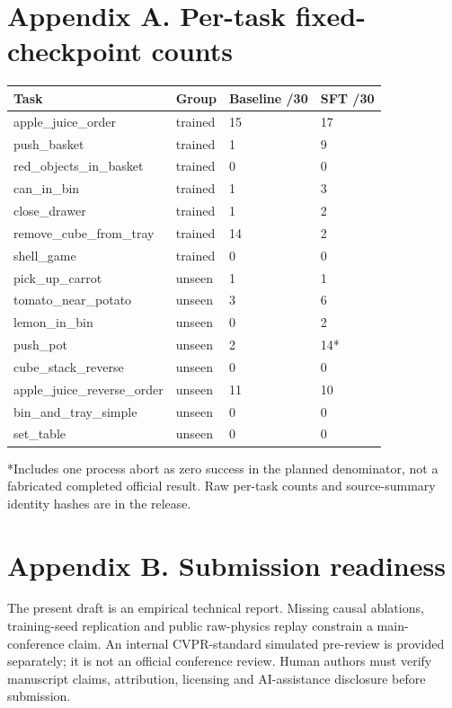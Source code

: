 \documentclass[10pt]{article}
\begin{document}
\section*{Appendix A. Per-task fixed-checkpoint counts}

\par\noindent\begin{minipage}{\linewidth}\centering\small\setlength{\tabcolsep}{4pt}\begin{tabular}{p{}p{}p{}p{}}\hline
Task & Group & Baseline /30 & SFT /30 \\ \hline
apple\_juice\_order & trained & 15 & 17 \\
push\_basket & trained & 1 & 9 \\
red\_objects\_in\_basket & trained & 0 & 0 \\
can\_in\_bin & trained & 1 & 3 \\
close\_drawer & trained & 1 & 2 \\
remove\_cube\_from\_tray & trained & 14 & 2 \\
shell\_game & trained & 0 & 0 \\
pick\_up\_carrot & unseen & 1 & 1 \\
tomato\_near\_potato & unseen & 3 & 6 \\
lemon\_in\_bin & unseen & 0 & 2 \\
push\_pot & unseen & 2 & 14* \\
cube\_stack\_reverse & unseen & 0 & 0 \\
apple\_juice\_reverse\_order & unseen & 11 & 10 \\
bin\_and\_tray\_simple & unseen & 0 & 0 \\
set\_table & unseen & 0 & 0 \\
\hline\end{tabular}\end{minipage}\par\medskip

*Includes one process abort as zero success in the planned denominator, not a fabricated completed official result. Raw per-task counts and source-summary identity hashes are in the release.

\section*{Appendix B. Submission readiness}

The present draft is an empirical technical report. Missing causal ablations, training-seed replication and public raw-physics replay constrain a main-conference claim. An internal CVPR-standard simulated pre-review is provided separately; it is not an official conference review. Human authors must verify manuscript claims, attribution, licensing and AI-assistance disclosure before submission.
\end{document}
